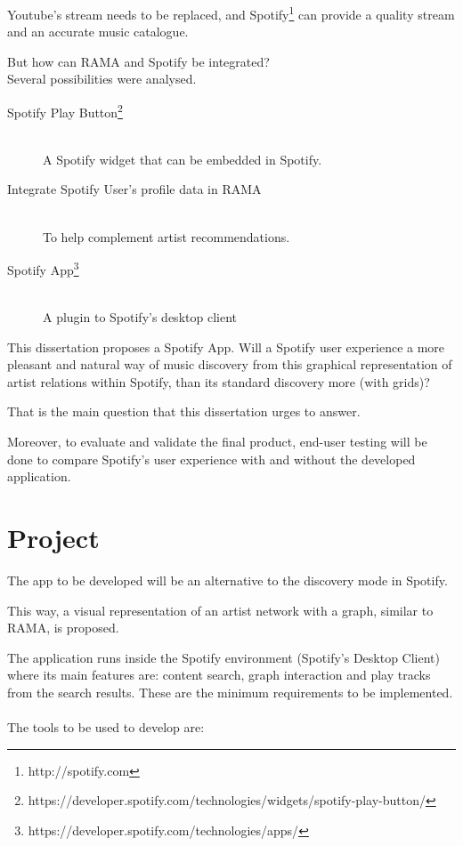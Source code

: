 Youtube's stream needs to be replaced, and Spotify\footnote{http://spotify.com} can provide a quality stream and an accurate music catalogue.

But how can RAMA and Spotify be integrated? \\

Several possibilities were analysed.

\begin{description}
  \item[Spotify Play Button\footnote{https://developer.spotify.com/technologies/widgets/spotify-play-button/}] \hfill \\
    A Spotify widget that can be embedded in Spotify. 
  \item[Integrate Spotify User's profile data in RAMA] \hfill \\
    To help complement artist recommendations.
  \item[Spotify App\footnote{https://developer.spotify.com/technologies/apps/}] \hfill \\
    A plugin to Spotify's desktop client
\end{description}


This dissertation proposes a Spotify App.
Will a Spotify user experience a more pleasant and natural way of music discovery from this graphical representation of artist relations within Spotify, than its standard discovery more (with grids)?

That is the main question that this dissertation urges to answer.

Moreover, to evaluate and validate the final product, end-user testing will be done to compare Spotify's user experience with and without the developed application. 


\section{Project} \label{sec:proj}

The app to be developed will be an alternative to the discovery mode in Spotify.

This way, a visual representation of an artist network with a graph, similar to RAMA, is proposed.

The application runs inside the Spotify environment (Spotify's Desktop Client) where its main features are: content search, graph interaction and play tracks from the search results.
These are the minimum requirements to be implemented.
\\
\\
The tools to be used to develop are:


